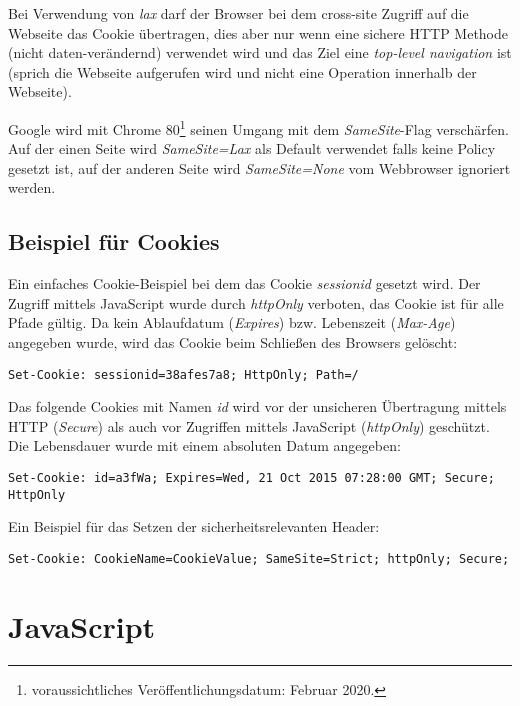 Bei Verwendung von \textit{lax} darf der Browser bei dem cross-site Zugriff auf die Webseite das Cookie übertragen, dies aber nur wenn eine sichere HTTP Methode (nicht daten-verändernd) verwendet wird und das Ziel eine \textit{top-level navigation} ist (sprich die Webseite aufgerufen wird und nicht eine Operation innerhalb der Webseite).

Google wird mit Chrome 80\footnote{voraussichtliches Veröffentlichungsdatum: Februar 2020.} seinen Umgang mit dem \textit{SameSite}-Flag verschärfen. Auf der einen Seite wird \textit{SameSite=Lax} als Default verwendet falls keine Policy gesetzt ist, auf der anderen Seite wird \textit{SameSite=None} vom Webbrowser ignoriert werden.

\subsection{Beispiel für Cookies}

Ein einfaches Cookie-Beispiel bei dem das Cookie \textit{sessionid} gesetzt wird. Der Zugriff mittels JavaScript wurde durch \textit{httpOnly} verboten, das Cookie ist für alle Pfade gültig. Da kein Ablaufdatum (\textit{Expires}) bzw. Lebenszeit (\textit{Max-Age}) angegeben wurde, wird das Cookie beim Schließen des Browsers gelöscht:

\begin{verbatim}
Set-Cookie: sessionid=38afes7a8; HttpOnly; Path=/
\end{verbatim}

Das folgende Cookies mit Namen \textit{id} wird vor der unsicheren Übertragung mittels HTTP (\textit{Secure}) als auch vor Zugriffen mittels JavaScript (\textit{httpOnly}) geschützt. Die Lebensdauer wurde mit einem absoluten Datum angegeben:

\begin{verbatim}
Set-Cookie: id=a3fWa; Expires=Wed, 21 Oct 2015 07:28:00 GMT; Secure; HttpOnly
\end{verbatim}

Ein Beispiel für das Setzen der sicherheitsrelevanten Header:

\begin{verbatim}
Set-Cookie: CookieName=CookieValue; SameSite=Strict; httpOnly; Secure;
\end{verbatim}

\section{JavaScript}

